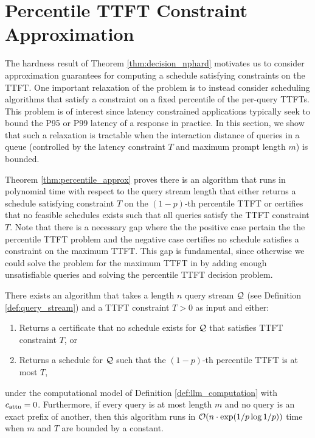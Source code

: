 

\section{Percentile TTFT Constraint Approximation}\label{sxn:extra_theory}

The hardness result of Theorem \ref{thm:decision_nphard} motivates us to consider approximation guarantees for computing a schedule satisfying constraints on the TTFT. One important relaxation of the problem is to instead consider scheduling algorithms that satisfy a constraint on a fixed percentile of the per-query TTFTs. This problem is of interest since latency constrained applications typically seek to bound the P95 or P99 latency of a response in practice. In this section, we show that such a relaxation is tractable when the interaction distance of queries in a queue (controlled by the latency constraint $T$ and maximum prompt length $m$) is bounded.

Theorem \ref{thm:percentile_approx} proves there is an algorithm that runs in polynomial time with respect to the query stream length that either returns a schedule satisfying constraint $T$ on the $(1-p)$-th percentile TTFT or certifies that no feasible schedules exists such that all queries satisfy the TTFT constraint $T$. Note that there is a necessary gap where the the positive case pertain the the percentile TTFT problem and the negative case certifies no schedule satisfies a constraint on the maximum TTFT. This gap is fundamental, since otherwise we could solve the problem for the maximum TTFT in by adding enough unsatisfiable queries and solving the percentile TTFT decision problem.


\begin{theorem}\label{thm:percentile_approx}
    There exists an algorithm that takes a length $n$ query stream $\mathcal{Q}$ (see Definition \ref{def:query_stream}) and a TTFT constraint $T > 0$ as input and either:
    \begin{enumerate}
        \item Returns a certificate that no schedule exists for $\mathcal{Q}$ that satisfies TTFT constraint $T$, or
        \item Returns a schedule for $\mathcal{Q}$ such that the $(1-p)$-th percentile TTFT is at most $T$,
    \end{enumerate}
    under the computational model of Definition \ref{def:llm_computation} with $c_{\mathrm{attn}}=0$. Furthermore, if every query is at most length $m$ and no query is an exact prefix of another, then this algorithm runs in $\mathcal{O}(n \cdot \exp(1/p \log 1/p))$ time when $m$ and $T$ are bounded by a constant.
\end{theorem}

